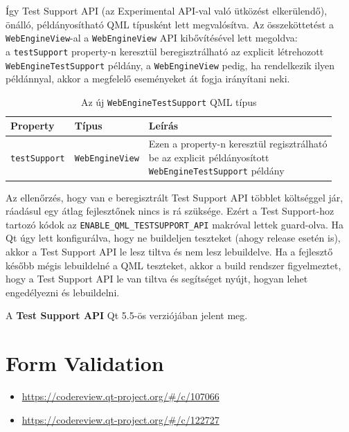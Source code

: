 \documentclass[12pt]{report}
\let\origurl\url
\renewcommand{\url}[1]{%
    \textcolor{blue}{\origurl{#1}}
}
\newcommand{\gerrit}[1]{%
    \textcolor{qtgreen}{\origurl{https://codereview.qt-project.org/\#/c/#1}}
}
\begin{document}
Így Test Support API (az Experimental API-val való ütközést elkerülendő), önálló,
példányosítható QML típusként lett megvalósítva. Az összeköttetést a \\
\texttt{WebEngineView}-al a \texttt{WebEngineView} API kibővítésével lett megoldva: \\
a \texttt{testSupport} property-n keresztül beregisztrálható az explicit létrehozott \\
\texttt{WebEngineTestSupport} példány, a \texttt{WebEngineView} pedig, ha rendelkezik
ilyen példánnyal, akkor a megfelelő eseményeket át fogja irányítani neki.

\begin{table}[h!]
    \centering
    \begin{tabular}{ | l | l | p{216pt} | }
        \hline
        \textbf{Property} & \textbf{Típus} & \textbf{Leírás} \\ \hline

        \texttt{testSupport} & \texttt{WebEngineView} &
        \makecell[l]{
            Ezen a property-n keresztül regisztrálható \\
            be az explicit példányosított \\
            \texttt{WebEngineTestSupport} példány}
        \\ \hline
    \end{tabular}
    \caption{
        \label{tab:test-support-webengine-view}
        Az új \texttt{WebEngineTestSupport} QML típus
    }
\end{table}

Az ellenőrzés, hogy van e beregisztrált Test Support API többlet költséggel jár, ráadásul
egy átlag fejlesztőnek nincs is rá szüksége. Ezért a Test Support-hoz tartozó kódok az
\texttt{ENABLE\_QML\_TESTSUPPORT\_API} makróval lettek guard-olva. Ha Qt úgy lett
konfigurálva, hogy ne buildeljen teszteket (ahogy release esetén is), akkor a Test Support
API le lesz tiltva és nem lesz lebuildelve. Ha a fejlesztő később mégis lebuildelné a
QML teszteket, akkor a build rendszer figyelmeztet, hogy a Test Support API le van tiltva
és segítséget nyújt, hogyan lehet engedélyezni és lebuildelni.

A \textbf{Test Support API} Qt 5.5-ös verziójában jelent meg.


\section{Form Validation}

\begin{center}
    \begin{reviewbox}
        \begin{itemize}
            \renewcommand{\labelitemi}{\textcolor{qtgreen}{$\blacktriangleright$}}
            \item \gerrit{107066}
            \item \gerrit{122727}
        \end{itemize}
    \end{reviewbox}
\end{center}
\end{document}
